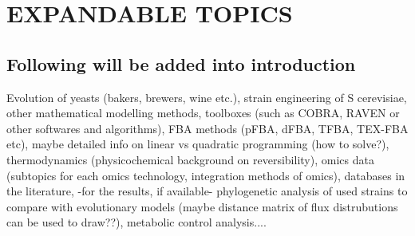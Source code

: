 \chapter{EXPANDABLE TOPICS}

\section{Following will be added into introduction}
Evolution of yeasts (bakers, brewers, wine etc.), strain engineering of S cerevisiae, other mathematical modelling methods, toolboxes (such as COBRA, RAVEN or other softwares and algorithms), FBA methods (pFBA, dFBA, TFBA, TEX-FBA etc), maybe detailed info on linear vs quadratic programming (how to solve?), thermodynamics (physicochemical background on reversibility), omics data (subtopics for each omics technology, integration methods of omics), databases in the literature, -for the results, if available- phylogenetic analysis of used strains to compare with evolutionary models (maybe distance matrix of flux distrubutions can be used to draw??), metabolic control analysis....
